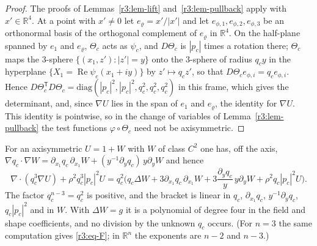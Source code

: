 \documentclass[11pt]{amsart}
\theoremstyle{definition}
\theoremstyle{remark}
\numberwithin{equation}{section}
\newcommand{\R}{\mathbb{R}}
\DeclareMathOperator{\re}{Re}
\begin{document}
\begin{proof}
The proofs of Lemmas~\ref{r3:lem-lift} and~\ref{r3:lem-pullback} apply with $x'\in\R^4$. At a point with $x'\neq0$ let $e_\varrho=x'/|x'|$ and let $e_{\phi,1},e_{\phi,2},e_{\phi,3}$ be an orthonormal basis of the orthogonal complement of $e_\varrho$ in $\R^4$. On the half-plane spanned by $e_1$ and $e_\varrho$, $\Theta_c$ acts as $\psi_c$, and $D\Theta_c$ is $|p_c|$ times a rotation there; $\Theta_c$ maps the $3$-sphere $\{(x_1,z'):|z'|=y\}$ onto the $3$-sphere of radius $q_cy$ in the hyperplane $\{X_1=\re\psi_c(x_1+iy)\}$ by $z'\mapsto q_cz'$, so that $D\Theta_ce_{\phi,i}=q_ce_{\phi,i}$. Hence $D\Theta_c^{\mathsf T}D\Theta_c=\mathrm{diag}(|p_c|^2,|p_c|^2,q_c^2,q_c^2,q_c^2)$ in this frame, which gives the determinant, and, since $\nabla U$ lies in the span of $e_1$ and $e_\varrho$, the identity for $\nabla U$. This identity is pointwise, so in the change of variables of Lemma~\ref{r3:lem-pullback} the test functions $\varphi\circ\Theta_c$ need not be axisymmetric.
\end{proof}

For an axisymmetric $U=1+W$ with $W$ of class $C^2$ one has, off the axis, $\nabla q_c\cdot\nabla W=\partial_{x_1}q_c\,\partial_{x_1}W+(y^{-1}\partial_yq_c)\,y\partial_yW$ and hence
\begin{equation}\label{r5:eq-div}
\nabla\cdot(q_c^3\nabla U)+\rho^2q_c^3|p_c|^2U=q_c^2\Big(q_c\Delta W+3\partial_{x_1}q_c\,\partial_{x_1}W+3\frac{\partial_yq_c}y\,y\partial_yW+\rho^2q_c|p_c|^2U\Big).
\end{equation}
The factor $q_c^{n-3}=q_c^2$ is positive, and the bracket is linear in $q_c$, $\partial_{x_1}q_c$, $y^{-1}\partial_yq_c$, $q_c|p_c|^2$ and in $W$. With $\Delta W=g$ it is a polynomial of degree four in the field and shape coefficients, and no division by the unknown $q_c$ occurs. (For $n=3$ the same computation gives \eqref{r3:eq-F}; in $\R^n$ the exponents are $n-2$ and $n-3$.)
\end{document}

